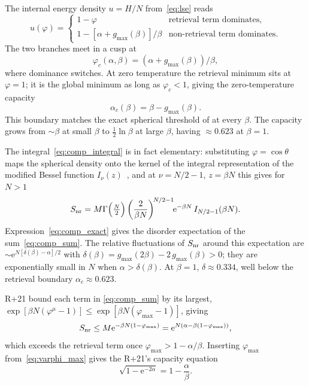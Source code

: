 \documentclass[letterpaper]{article} %
\newcommand{\e}{{\mathrm{e}}}
\newcommand{\Bnet}{\beta}
\newcommand{\ac}{\alpha_c}
\begin{document}
The internal energy density $u = H/N$ from~\eqref{eq:lse} reads
\begin{equation}
    u(\varphi) = \begin{cases}
        1 - \varphi & \text{retrieval term dominates}, \\
        1 - [\alpha + g_{\max}(\Bnet)]/\Bnet & \text{non-retrieval term dominates}.
    \end{cases}
    \label{eq:u_piecewise}
\end{equation}
The two branches meet in a cusp at
\begin{equation}
\varphi_c(\alpha, \Bnet) = (\alpha + g_{\max}(\Bnet))/\Bnet,
\label{eq:cusp}
\end{equation}
where dominance switches. At zero temperature the retrieval minimum sits at
$\varphi = 1$; it is the global minimum as long as $\varphi_c < 1$, giving the
zero-temperature capacity
\begin{equation}
\ac(\Bnet) = \Bnet - g_{\max}(\Bnet).
\label{eq:capacity_T0}
\end{equation}
This boundary matches the exact spherical threshold of
\citet{lucibello2024exponential} at every $\Bnet$. The capacity grows from $\sim\Bnet$ at small $\Bnet$ to $\tfrac12 \ln\Bnet$ at
large $\Bnet$, having $\approx 0.623$ at $\Bnet = 1$.

The integral~\eqref{eq:comp_integral} is in fact elementary: substituting $\varphi = \cos\theta$ maps the spherical density onto the kernel of the integral representation of the modified Bessel function $I_\nu(z)$~\citep[8.431.3]{gradshteyn2015}, and at $\nu = N/2 - 1$, $z = \Bnet N$ this gives for $N > 1$
\begin{equation}
S_{\rm nr} = M \Gamma\Big(\tfrac{N}{2}\Big)\left(\frac{2}{\Bnet N}\right)^{\!N/2-1}\!\!\e^{-\Bnet N}\,I_{N/2-1}(\Bnet N).
\label{eq:comp_exact}
\end{equation}
Expression~\eqref{eq:comp_exact} gives the disorder expectation of the sum~\eqref{eq:comp_sum}. The relative fluctuations of $S_{\rm nr}$ around this expectation are $\sim \e^{N[\delta(\Bnet) - \alpha]/2}$ with $\delta(\Bnet) = g_{\max}(2\Bnet) - 2\,g_{\max}(\Bnet) > 0$; they are exponentially small in $N$ when $\alpha > \delta(\Bnet)$. At $\Bnet = 1$, $\delta \approx 0.334$, well below the retrieval boundary $\alpha_c \approx 0.623$.

R+21 bound each term in \eqref{eq:comp_sum} by its largest, $\exp[\Bnet N(\varphi^\mu - 1)] \leq \exp[\Bnet N(\varphi_{\max} - 1)]$, giving
\begin{equation}
    S_{\rm nr} \leq M\e^{-\Bnet N(1-\varphi_{\max})} = \e^{N(\alpha - \Bnet(1-\varphi_{\max}))},
    \label{eq:ramsauer_bound}
\end{equation}
which exceeds the retrieval term once $\varphi_{\max} > 1 - \alpha/\Bnet$. Inserting $\varphi_{\max}$ from~\eqref{eq:varphi_max} gives the R+21's capacity equation
\begin{equation}
    \sqrt{1 - \e^{-2\alpha}} = 1 - \frac{\alpha}{\Bnet}.
    \label{eq:ramsauer_capacity}
\end{equation}
\end{document}
